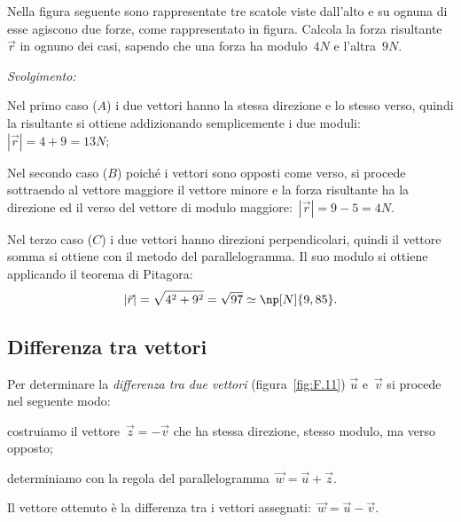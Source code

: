 \begin{exrig}
\begin{esempio}
Nella figura seguente sono rappresentate tre scatole viste dall'alto e su ognuna di esse agiscono due forze, come rappresentato in figura. Calcola la forza risultante $\vec{r}$ in ognuno dei casi,
sapendo che una forza ha modulo~$4 \unit{N}$ e l'altra~$9 \unit{N}$.
\begin{center}
 
\end{center}
\newpage
\emph{Svolgimento:}
\begin{enumeratea}
\item Nel primo caso ($A$) i due vettori hanno la stessa direzione e lo stesso verso, quindi la risultante si ottiene addizionando semplicemente i due moduli:~$|\vec{r}|=4 +9 =13 \unit{N}$;
\item Nel secondo caso ($B$) poiché i vettori sono opposti come verso, si procede sottraendo al vettore maggiore il vettore minore e la forza risultante ha la direzione ed il verso
del vettore di modulo maggiore:~$|\vec{r}|=9 - 5 =4 \unit{N}$.
\item Nel terzo caso ($C$) i due vettori hanno direzioni perpendicolari, quindi il vettore somma si ottiene con il metodo del parallelogramma. Il suo modulo si ottiene applicando il teorema di Pitagora:
\[|\vec{r}|=\sqrt{4^2+9^2}=\sqrt{97}\simeq \np[N]{9,85}.\]
\end{enumeratea}
\end{esempio}
\end{exrig}

\subsection{Differenza tra vettori}

\begin{procedura} Per determinare la \emph{differenza tra due vettori} (figura~\ref{fig:F.11}) $\vec{u}$ e~$\vec{v}$
si procede nel seguente modo:
\begin{enumeratea}
\item costruiamo il vettore~$\vec{z}=-\vec{v}$ che ha stessa direzione, stesso modulo, ma verso opposto;
\item determiniamo con la regola del parallelogramma~$\vec{w}=\vec{u}+\vec{z}$.
\end{enumeratea}
Il vettore ottenuto è la differenza tra i vettori assegnati:~$\vec{w}=\vec{u}-\vec{v}$.
\end{procedura}

